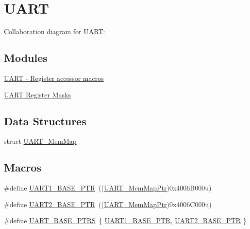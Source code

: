 \hypertarget{group___u_a_r_t___peripheral}{}\section{U\+A\+RT}
\label{group___u_a_r_t___peripheral}
Collaboration diagram for U\+A\+RT\+:
\subsection*{Modules}
\begin{DoxyCompactItemize}
\item 
\hyperlink{group___u_a_r_t___register___accessor___macros}{U\+A\+R\+T -\/ Register accessor macros}
\item 
\hyperlink{group___u_a_r_t___register___masks}{U\+A\+R\+T Register Masks}
\end{DoxyCompactItemize}
\subsection*{Data Structures}
\begin{DoxyCompactItemize}
\item 
struct \hyperlink{struct_u_a_r_t___mem_map}{U\+A\+R\+T\+\_\+\+Mem\+Map}
\end{DoxyCompactItemize}
\subsection*{Macros}
\begin{DoxyCompactItemize}
\item 
\#define \hyperlink{group___u_a_r_t___peripheral_gafb5b1236c1cdf2d9a6464251b791030c}{U\+A\+R\+T1\+\_\+\+B\+A\+S\+E\+\_\+\+P\+TR}~((\hyperlink{group___u_a_r_t___peripheral_ga306cf44b593fadbb29a065f42e3f68f0}{U\+A\+R\+T\+\_\+\+Mem\+Map\+Ptr})0x4006\+B000u)
\item 
\#define \hyperlink{group___u_a_r_t___peripheral_ga75ca2ea4e490b3c1c7aa55fc9c25cd37}{U\+A\+R\+T2\+\_\+\+B\+A\+S\+E\+\_\+\+P\+TR}~((\hyperlink{group___u_a_r_t___peripheral_ga306cf44b593fadbb29a065f42e3f68f0}{U\+A\+R\+T\+\_\+\+Mem\+Map\+Ptr})0x4006\+C000u)
\item 
\#define \hyperlink{group___u_a_r_t___peripheral_ga7b34a38b9492a1e1007b2f66383aef17}{U\+A\+R\+T\+\_\+\+B\+A\+S\+E\+\_\+\+P\+T\+RS}~\{ \hyperlink{group___u_a_r_t___peripheral_gafb5b1236c1cdf2d9a6464251b791030c}{U\+A\+R\+T1\+\_\+\+B\+A\+S\+E\+\_\+\+P\+TR}, \hyperlink{group___u_a_r_t___peripheral_ga75ca2ea4e490b3c1c7aa55fc9c25cd37}{U\+A\+R\+T2\+\_\+\+B\+A\+S\+E\+\_\+\+P\+TR} \}
\end{DoxyCompactItemize}
